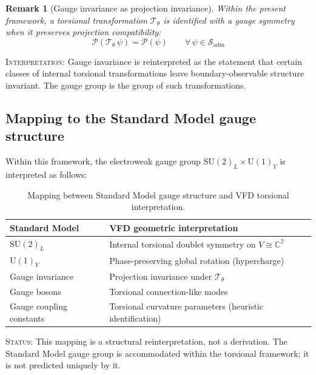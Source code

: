 \documentclass[12pt]{article}
\newtheorem{remark}[theorem]{Remark}
\newcommand{\Tcal}{\mathcal{T}}
\newcommand{\Pcal}{\mathcal{P}}
\begin{document}
\begin{remark}[Gauge invariance as projection invariance]\label{rem:gauge}
Within the present framework, a torsional transformation $\Tcal_\theta$ is identified with a gauge symmetry when it preserves projection compatibility:
\begin{equation}\label{eq:gaugeinv}
    \Pcal(\Tcal_\theta\, \psi) = \Pcal(\psi) \qquad \forall\, \psi \in \mathcal{S}_{\mathrm{adm}}
\end{equation}
\end{remark}

\textsc{Interpretation:} Gauge invariance is reinterpreted as the statement that certain classes of internal torsional transformations leave boundary-observable structure invariant. The gauge group is the group of such transformations.

\subsection{Mapping to the Standard Model gauge structure}

Within this framework, the electroweak gauge group $\mathrm{SU}(2)_L \times \mathrm{U}(1)_Y$ is interpreted as follows:

\begin{table}[ht]
\centering
\caption{Mapping between Standard Model gauge structure and VFD torsional interpretation.}
\label{tab:gaugemap}
\begin{tabular}{@{}ll@{}}
\toprule
Standard Model & VFD geometric interpretation \\
\midrule
$\mathrm{SU}(2)_L$ & Internal torsional doublet symmetry on $V \cong \mathbb{C}^2$ \\
$\mathrm{U}(1)_Y$ & Phase-preserving global rotation (hypercharge) \\
Gauge invariance & Projection invariance under $\Tcal_\theta$ \\
Gauge bosons & Torsional connection-like modes \\
Gauge coupling constants & Torsional curvature parameters (heuristic identification) \\
\bottomrule
\end{tabular}
\end{table}

\textsc{Status:} This mapping is a structural reinterpretation, not a derivation. The Standard Model gauge group is accommodated within the torsional framework; it is not predicted uniquely by it.

\end{document}
